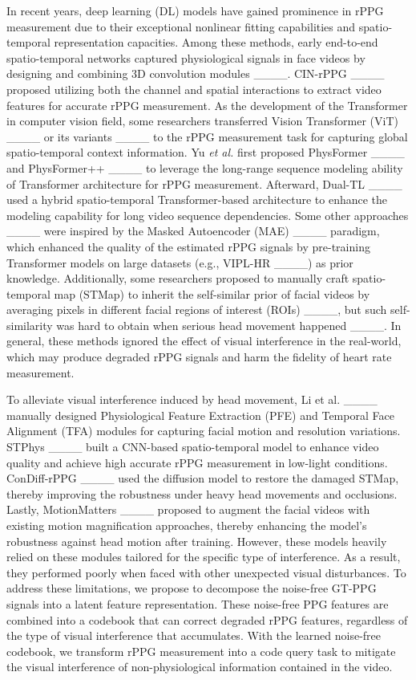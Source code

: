 In recent years, deep learning (DL) models have gained prominence in rPPG measurement due to their exceptional nonlinear fitting capabilities and spatio-temporal representation capacities. Among these methods, early end-to-end spatio-temporal networks captured physiological signals in face videos by designing and combining 3D convolution modules ____. CIN-rPPG ____ proposed utilizing both the channel and spatial interactions to extract video features for accurate rPPG measurement. As the development of the Transformer in computer vision field, some researchers transferred Vision Transformer (ViT) ____ or its variants ____ to the rPPG measurement task for capturing global spatio-temporal context information. Yu \textit{et al.} first proposed PhysFormer ____ and PhysFormer++ ____ to leverage the long-range sequence modeling ability of Transformer architecture for rPPG measurement. Afterward, Dual-TL ____ used a hybrid spatio-temporal Transformer-based architecture to enhance the modeling capability for long video sequence dependencies. Some other approaches ____ were inspired by the Masked Autoencoder (MAE) ____ paradigm, which enhanced the quality of the estimated rPPG signals by pre-training Transformer models on large datasets (e.g., VIPL-HR ____) as prior knowledge. Additionally, some researchers proposed to manually craft spatio-temporal map (STMap) to inherit the self-similar prior of facial videos by averaging pixels in different facial regions of interest (ROIs) ____, but such self-similarity was hard to obtain when serious head movement happened ____. In general, these methods ignored the effect of visual interference in the real-world, which may produce degraded rPPG signals and harm the fidelity of heart rate measurement.

To alleviate visual interference induced by head movement, Li et al. ____ manually designed Physiological Feature Extraction (PFE) and Temporal Face Alignment (TFA) modules for capturing facial motion and resolution variations. STPhys ____ built a CNN-based spatio-temporal model to enhance video quality and achieve high accurate rPPG measurement in low-light conditions. ConDiff-rPPG ____ used the diffusion model to restore the damaged STMap, thereby improving the robustness under heavy head movements and occlusions. Lastly, MotionMatters ____ proposed to augment the facial videos with existing motion magnification approaches, thereby enhancing the model's robustness against head motion after training. However, these models heavily relied on these modules tailored for the specific type of interference. As a result, they performed poorly when faced with other unexpected visual disturbances. To address these limitations, we propose to decompose the noise-free GT-PPG signals into a latent feature representation. These noise-free PPG features are combined into a codebook that can correct degraded rPPG features, regardless of the type of visual interference that accumulates. With the learned noise-free codebook, we transform rPPG measurement into a code query task to mitigate the visual interference of non-physiological information contained in the video.

